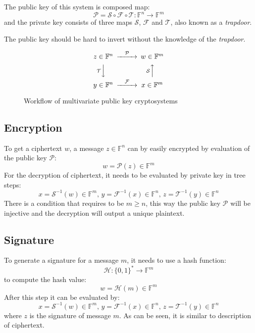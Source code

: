 \documentclass[thesis=M,english]{FITthesis}[2019/12/23]
\begin{document}
The public key of this system is composed map:
\[
	\mathcal{P} = \mathcal{S} \circ \mathcal{F} \circ \mathcal{T} : \mathbb{F}^n \rightarrow \mathbb{F}^m
\]
and the private key consists of three maps $\mathcal{S}$, $\mathcal{F}$ and $\mathcal{T}$, also known as a \textit{trapdoor}.

The public key should be hard to invert without the knowledge of the \textit{trapdoor}.

\begin{figure}[h]
\begin{equation*}
  \begin{CD}
     z \in \mathbb{F}^n @>  \mathcal{P} >> w \in \mathbb{F}^m \\
    @V\mathcal{T}VV  @A\mathcal{S}AA \\
  y \in \mathbb{F}^n @> \mathcal{F} >> x \in \mathbb{F}^m
  \end{CD}
\end{equation*}
\caption{Workflow of multivariate public key cryptosystems}
\end{figure}
\smallskip

\subsection{Encryption}
To get a ciphertext $w$, a message $z \in \mathbb{F}^n$ can by easily encrypted by evaluation of the public key $\mathcal{P}$:
\[
	w = \mathcal{P}(z) \in \mathbb{F}^m
\]
For the decryption of ciphertext, it needs to be evaluated by private key in tree steps: 
\[
	x = \mathcal{S}^{-1}(w) \in \mathbb{F}^m, \, y = \mathcal{F}^{-1}(x) \in \mathbb{F}^n, \, z = \mathcal{T}^{-1}(y) \in \mathbb{F}^n
\]
There is a condition that requires to be $m \geq n$, this way the public key $\mathcal{P}$ will be injective and the decryption will output a unique plaintext.

\subsection{Signature}
To generate a signature for a message $m$, it needs to use a hash function:
\[
	\mathcal{H}: \{0,1\}^{*} \rightarrow \mathbb{F}^m
\]
to compute the hash value:
\[
	w = \mathcal{H}(m) \in \mathbb{F}^m
\]
After this step it can be evaluated by:
\[
	x = \mathcal{S}^{-1}(w) \in \mathbb{F}^m, \, y = \mathcal{F}^{-1}(x) \in \mathbb{F}^n, \, z = \mathcal{T}^{-1}(y) \in \mathbb{F}^n
\]
where $z$ is the signature of message $m$. As can be seen, it is similar to description of ciphertext.
\end{document}

